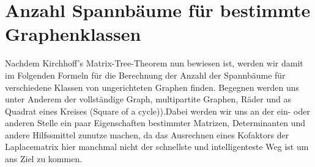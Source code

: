 
\section{Anzahl Spannbäume für bestimmte Graphenklassen}
Nachdem Kirchhoff's Matrix-Tree-Theorem nun bewiesen ist, werden wir damit im Folgenden Formeln für die Berechnung der Anzahl der Spannbäume für verschiedene Klassen von ungerichteten Graphen finden. Begegnen werden uns unter Anderem der vollständige Graph, multipartite Graphen, Räder und as Quadrat eines Kreises (Square of a cycle)).Dabei werden wir uns an der ein- oder anderen Stelle ein paar Eigenschaften bestimmter Matrizen, Determinanten und andere Hilfssmittel zunutze machen, da das Ausrechnen eines Kofaktors der Laplacematrix hier manchmal nicht der schnellste und intelligenteste Weg ist um ans Ziel zu kommen. 








